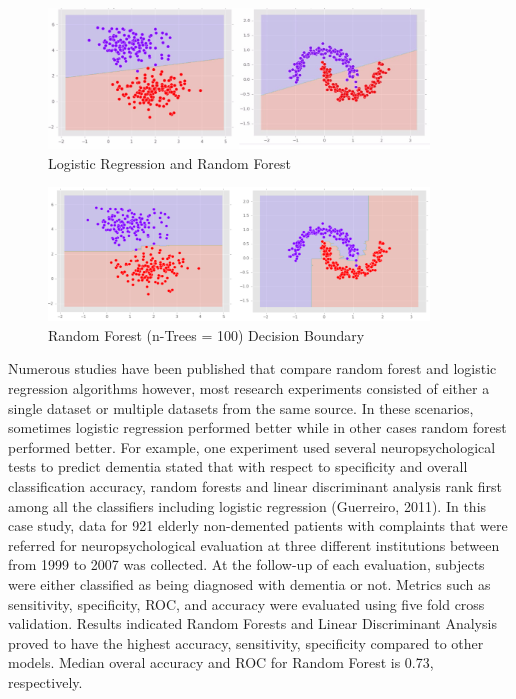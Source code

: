 \documentclass{llncs}
\begin{document}
\begin{figure}
\centering
\includegraphics[width=0.9\textwidth]{decisionboundary.png}
\caption{Logistic Regression and Random Forest}
\label{fig:boundary1}
\end{figure}

\begin{figure}
\centering
\includegraphics[width=0.9\textwidth]{decisionboundary2.png}
\caption{Random Forest (n-Trees = 100) Decision Boundary}
\label{fig:boundary2}
\end{figure}

\noindent 
Numerous studies have been published that compare random forest and logistic regression algorithms however, most research experiments consisted of either a single dataset or multiple datasets from the same source. In these scenarios, sometimes logistic regression performed better while in other cases random forest performed better. For example, one experiment used several neuropsychological tests to predict dementia stated that with respect to specificity and overall classification accuracy, random forests and linear discriminant analysis rank first among all the classifiers including logistic regression (Guerreiro, 2011). In this case study, data for 921 elderly non-demented patients with complaints that were referred for neuropsychological evaluation at three different institutions between from 1999 to 2007 was collected. At the follow-up of each evaluation, subjects were either classified as being diagnosed with dementia or not. Metrics such as sensitivity, specificity, ROC, and accuracy were evaluated using five fold cross validation. Results indicated Random Forests and Linear Discriminant Analysis proved to have the highest accuracy, sensitivity, specificity compared to other models. Median overal accuracy and ROC for Random Forest is 0.73, respectively.   
\end{document}
